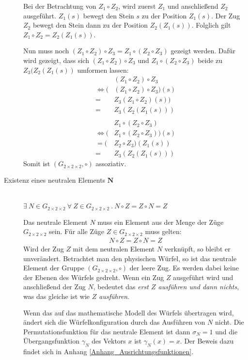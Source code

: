 \documentclass[12pt,a4paper, usenames, dvipsnames]{article}
\theoremstyle{mystyle}
\theoremstyle{definition}
\newcommand{\Gtwo}{\ensuremath{G_{2\times 2\times 2}}}
\begin{document}
\begin{description}
Bei der Betrachtung von $Z_1 \circ Z_2 $, wird zuerst $Z_1$ und anschließend $Z_2$ ausgeführt. $Z_1(s)$ bewegt den Stein $s$ zu der Position $Z_1(s)$. Der Zug $Z_2$ bewegt den Stein dann zu der Position $Z_2(Z_1(s))$. Folglich gilt $Z_1 \circ Z_2 = Z_2(Z_1(s))$. 


Nun muss noch $(Z_1 \circ Z_2) \circ Z_3 = Z_1 \circ (Z_2 \circ Z_3)$ gezeigt werden. Dafür wird gezeigt, dass sich $(Z_1 \circ Z_2) \circ Z_3$ und $Z_1 \circ (Z_2 \circ Z_3)$ beide zu $Z_3(Z_2(Z_1(s))$ umformen lassen: 
\begin{align*}
& (Z_1 \circ Z_2) \circ Z_3  \\
\Leftrightarrow (&(Z_1 \circ Z_2) \circ Z_3)(s) \\
= & Z_3(Z_1 \circ Z_2)(s)) \\
= & Z_3(Z_2(Z_1(s)))  
\\
\\
&Z_1 \circ (Z_2 \circ Z_3) \\
\Leftrightarrow (&Z_1 \circ (Z_2 \circ Z_3))(s) \\
= (&Z_2 \circ Z_3)(Z_1(s)) \\
= \ \ & Z_3(Z_2(Z_1(s)))  
\end{align*}
Somit ist $(\Gtwo, \circ)$ assoziativ.

\item [Existenz eines neutralen Elements $\boldsymbol{N}$] \ \\
$\exists \ N \in \Gtwo \  \forall \ Z \in \Gtwo \ . \ N \circ Z = Z \circ N = Z$ 


Das neutrale Element $N$ muss ein Element aus der Menge der Züge $\Gtwo$ sein. Für alle Züge $Z \in \Gtwo$ muss gelten: 
\begin{align*}
N \circ Z = Z \circ N = Z
\end{align*}
Wird der Zug $Z$ mit dem neutralen Element $N$ verknüpft, so bleibt er unverändert. Betrachtet man den physischen Würfel, so ist das neutrale Element der Gruppe $(\Gtwo, \circ)$ der leere Zug. Es werden dabei keine der Ebenen des Würfels gedreht. Wenn ein Zug $Z$ ausgeführt wird und anschließend der Zug $N$, bedeutet das \textit{erst $Z$ ausführen und dann nichts}, was das gleiche ist wie \textit{$Z$ ausführen}. 

Wenn das auf das mathematische Modell des Würfels übertragen wird, ändert sich die Würfelkonfiguration durch das Ausführen von $N$ nicht. Die Permutationsfunktion für das  neutrale Element ist dann $\sigma_N=1$ und die Übergangsfunktion $\gamma_N$ des Vektors $x$ ist $\gamma_N(x)=x$. Der Beweis dazu findet sich in Anhang \ref{Anhang_Ausrichtungsfunktionen}.


\end{description}
\end{document}
